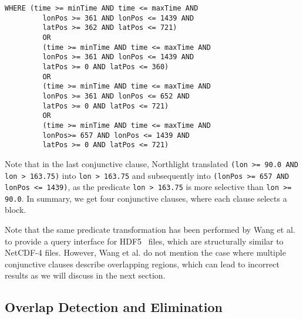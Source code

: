 \documentclass[conference]{IEEEtran}
\newcommand{\system}{Northlight}
\newcommand{\smalltt}[1]{{\texttt{\small #1}}}
\begin{document}
\noindent 
\begin{minipage}{\linewidth}
\begin{lstlisting}[style=sql, caption={\smalltt{WHERE}-clause of globally rewritten query~$Q_2^{g}$.}, label={listing:q2_global}]
WHERE (time >= minTime AND time <= maxTime AND
         lonPos >= 361 AND lonPos <= 1439 AND
         latPos >= 362 AND latPos <= 721)
         OR
         (time >= minTime AND time <= maxTime AND
         lonPos >= 361 AND lonPos <= 1439 AND
         latPos >= 0 AND latPos <= 360) 
         OR
         (time >= minTime AND time <= maxTime AND
         lonPos >= 361 AND lonPos <= 652 AND
         latPos >= 0 AND latPos <= 721) 
         OR
         (time >= minTime AND time <= maxTime AND
         lonPos>= 657 AND lonPos <= 1439 AND
         latPos >= 0 AND latPos <= 721) 
\end{lstlisting}
\end{minipage}

\noindent Note that in the last conjunctive clause, \system{} translated 
\mbox{\smalltt{(lon >= 90.0 AND lon > 163.75)}} into 
\mbox{\smalltt{lon > 163.75}} and subsequently into
\smalltt{(lonPos >= 657 AND lonPos <= 1439)}, as the predicate \smalltt{lon > 163.75} is more selective than \smalltt{lon >= 90.0}.
In summary, we get four conjunctive clauses, where each clause selects a block.

Note that the same predicate transformation has been performed by Wang et al.~\cite{lit:rewriting} to provide a query interface for HDF5~\cite{list:hdf5} files, which are structurally similar to NetCDF-4 files.
However, Wang et al. do not mention the case where multiple conjunctive clauses describe overlapping regions, which can lead to incorrect results as we will discuss in the next section.




\subsection{Overlap Detection and Elimination}
\label{ssec:overlap}
\end{document}
